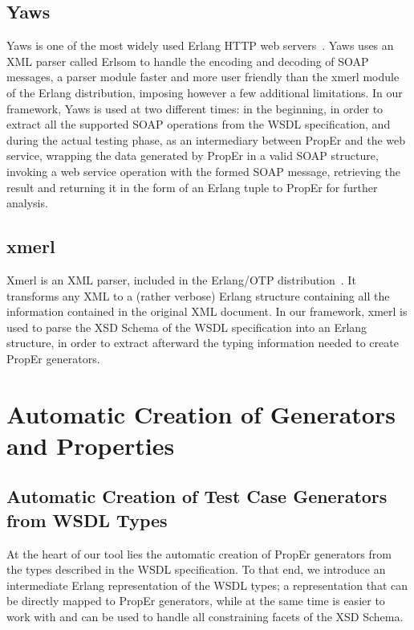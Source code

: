 \documentclass[copyright]{eptcs}
\begin{document}
\subsection{Yaws}

Yaws is one of the most widely used Erlang HTTP web servers~\cite{yaws}.
Yaws uses an XML parser called Erlsom to handle the encoding and decoding
of SOAP messages, a parser module faster and more user friendly than
the xmerl module of the Erlang distribution, imposing however a few
additional limitations. In our framework, Yaws is used at two
different times: in the beginning, in order to extract all the
supported SOAP operations from the WSDL specification, and during the
actual testing phase, as an intermediary between PropEr and the web
service, wrapping the data generated by PropEr in a valid SOAP
structure, invoking a web service operation with the formed SOAP
message, retrieving the result and returning it in the form of an
Erlang tuple to PropEr for further analysis.

\subsection{xmerl}

Xmerl is an XML parser, included in the Erlang/OTP distribution~\cite{xmerl}.
It transforms any XML to a (rather verbose) Erlang structure containing all the 
information contained in the original XML document. In our framework, xmerl is 
used to parse the XSD Schema of the WSDL specification into an Erlang structure, in 
order to extract afterward the typing information needed to create PropEr generators.

\section{Automatic Creation of Generators and Properties} \label{sec:automatic}

\subsection{Automatic Creation of Test Case Generators from WSDL Types}

At the heart of our tool lies the automatic creation of PropEr generators from 
the types described in the WSDL specification. To that end, we introduce an 
intermediate Erlang representation of the WSDL types; a representation that can 
be directly mapped to PropEr generators, while at the same time is
easier to work with and can be used to handle all constraining facets
of the XSD Schema.
\end{document}
